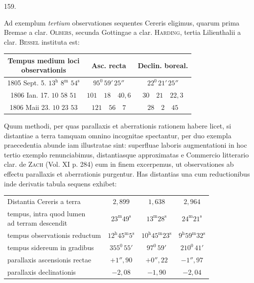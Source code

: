 \par{}\medskip
\hypertarget{native-218-article159}{}
\begin{center}159.\end{center}
Ad exemplum \emph{tertium} observationes sequentes Cereris eligimus, quarum
prima Bremae a clar. \textsc{Olbers}, secunda Gottingae a clar. \textsc{Harding}, tertia Lilienthalii a clar. \textsc{Bessel} instituta est:
\begin{center}\begingroup\footnotesize\setlength{\tabcolsep}{3pt}\renewcommand{\arraystretch}{1.3}
\begin{tabular}{|c|c|c|}
\hline
\shortstack{Tempus medium loci\\observationis} & Asc. recta & Declin. boreal. \\
\hline
1805 Sept. 5. $13^{\mathrm h}$ $8^{\mathrm m}$ $54^{\mathrm s}$ & $95^0\,59'\,25''$ & $22^0\,21'\,25''$ \\
1806 Ian. 17. $10$ $58$ $51$ & $101\quad18\quad40{,}6$ & $30\quad21\quad22{,}3$ \\
1806 Maii 23. $10$ $23$ $53$ & $121\quad56\quad7$ & $28\quad2\quad45$ \\
\hline
\end{tabular}
\endgroup\end{center}

Quum methodi, per quas parallaxis et aberrationis rationem habere licet,
si distantiae a terra tamquam omnino incognitae spectantur, per duo exempla
praecedentia abunde iam illustratae sint: superfluae laboris augmentationi in
hoc tertio exemplo renunciabimus, distantiasque approximatas e Commercio
litterario clar. de \textsc{Zach} (Vol. XI p. 284) eum in finem excerpemus, ut observationes ab effectu parallaxis et aberrationis purgentur. Has distantias una
cum reductionibus inde derivatis tabula sequens exhibet:
\begin{center}\begingroup\footnotesize\setlength{\tabcolsep}{3pt}\renewcommand{\arraystretch}{1.3}
\begin{tabular}{l|c|c|c}
Distantia Cereris a terra & $2{,}899$ & $1{,}638$ & $2{,}964$ \\
\shortstack[l]{tempus, intra quod lumen\\ad terram descendit} & $23^{\mathrm m}49^{\mathrm s}$ & $13^{\mathrm m}28^{\mathrm s}$ & $24^{\mathrm m}21^{\mathrm s}$ \\
tempus observationis reductum & $12^{\mathrm h}45^{\mathrm m}5^{\mathrm s}$ & $10^{\mathrm h}45^{\mathrm m}23^{\mathrm s}$ & $9^{\mathrm h}59^{\mathrm m}32^{\mathrm s}$ \\
tempus sidereum in gradibus & $355^0\,55'$ & $97^0\,59'$ & $210^0\,41'$ \\
parallaxis ascensionis rectae & $+1''{,}90$ & $+0''{,}22$ & $-1''{,}97$ \\
parallaxis declinationis & $-2{,}08$ & $-1{,}90$ & $-2{,}04$ \\
\end{tabular}
\endgroup\end{center}

